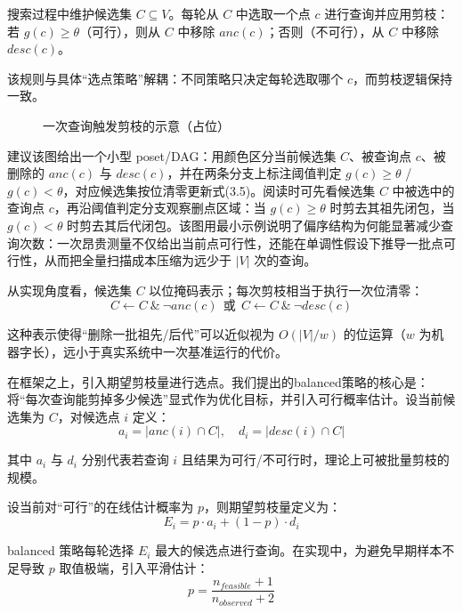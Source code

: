 \documentclass[UTF8,a4paper,12pt]{ctexart}
\numberwithin{equation}{section}
\begin{document}
搜索过程中维护候选集 \(C \subseteq V\)。每轮从 \(C\) 中选取一个点 \(c\)
进行查询并应用剪枝：若 \(g(c)\ge\theta\)（可行），则从 \(C\) 中移除
\(anc(c)\)；否则（不可行），从 \(C\) 中移除 \(desc(c)\)。

该规则与具体``选点策略''解耦：不同策略只决定每轮选取哪个
\(c\)，而剪枝逻辑保持一致。

\begin{figure}[htbp]
  \centering
  \caption{一次查询触发剪枝的示意（占位）}
  \label{fig:single-query-pruning-placeholder}
\end{figure}

建议该图给出一个小型 poset/DAG：用颜色区分当前候选集 \(C\)、被查询点
\(c\)、被删除的 \(anc(c)\) 与 \(desc(c)\)，并在两条分支上标注阈值判定
\(g(c)\ge\theta\) / \(g(c)<\theta\)，对应候选集按位清零更新式(3.5)。阅读时可先看候选集 \(C\) 中被选中的查询点 \(c\)，再沿阈值判定分支观察删点区域：当 \(g(c)\ge\theta\) 时剪去其祖先闭包，当 \(g(c)<\theta\) 时剪去其后代闭包。该图用最小示例说明了偏序结构为何能显著减少查询次数：一次昂贵测量不仅给出当前点可行性，还能在单调性假设下推导一批点可行性，从而把全量扫描成本压缩为远少于 \(|V|\) 次的查询。

从实现角度看，候选集 \(C\) 以位掩码表示；每次剪枝相当于执行一次位清零：
\begin{equation}
C \leftarrow C\ \&\ \neg anc(c)\ \ \text{或}\ \ C \leftarrow C\ \&\ \neg desc(c)
\end{equation}

这种表示使得``删除一批祖先/后代''可以近似视为 \(O(|V|/w)\)
的位运算（\(w\) 为机器字长），远小于真实系统中一次基准运行的代价。

在框架之上，引入期望剪枝量进行选点。我们提出的balanced策略的核心是：将``每次查询能剪掉多少候选''显式作为优化目标，并引入可行概率估计。设当前候选集为
\(C\)，对候选点 \(i\) 定义：
\begin{equation}
a_i = |anc(i) \cap C|,\quad d_i = |desc(i) \cap C|
\end{equation}

其中 \(a_i\) 与 \(d_i\) 分别代表若查询 \(i\)
且结果为可行/不可行时，理论上可被批量剪枝的规模。

设当前对``可行''的在线估计概率为 \(p\)，则期望剪枝量定义为：
\begin{equation}
E_i = p\cdot a_i + (1-p)\cdot d_i
\end{equation}

balanced 策略每轮选择 \(E_i\)
最大的候选点进行查询。在实现中，为避免早期样本不足导致 \(p\)
取值极端，引入平滑估计：
\begin{equation}
p = \frac{n_{feasible}+1}{n_{observed}+2}
\end{equation}
\end{document}
